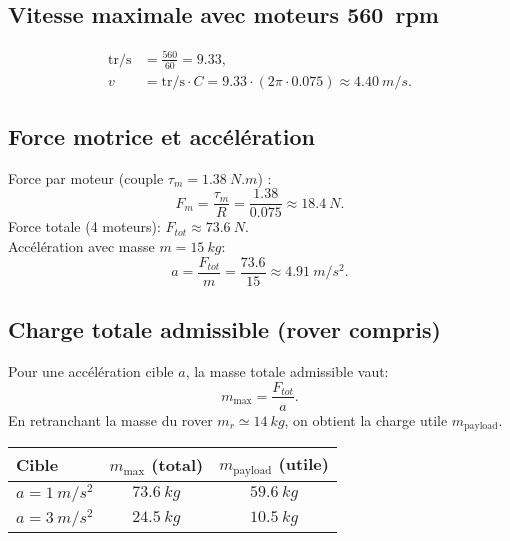 \documentclass[11pt,a4paper]{article}
\begin{document}
\subsection{Vitesse maximale avec moteurs \SI{560}{rpm}}
\begin{align}
\mathrm{tr/s} &= \frac{560}{60}=9.33,\\
v &= \mathrm{tr/s}\cdot C = 9.33\cdot (2\pi\cdot 0.075)\approx \boxed{\SI{4.40}{m/s}}.
\end{align}

\subsection{Force motrice et accélération}
Force par moteur (couple \(\tau_m=\SI{1.38}{N.m}\)) :
\begin{equation}
F_m=\frac{\tau_m}{R}=\frac{1.38}{0.075}\approx \SI{18.4}{N}.
\end{equation}
Force totale (4 moteurs): \(\boxed{F_{tot}\approx \SI{73.6}{N}}\).\\
Accélération avec masse \(m=\SI{15}{kg}\):
\begin{equation}
a=\frac{F_{tot}}{m}=\frac{73.6}{15}\approx \boxed{\SI{4.91}{m/s^2}}.
\end{equation}

\subsection{Charge totale admissible (rover compris)}
Pour une accélération cible \(a\), la masse totale admissible vaut:
\begin{equation}
m_{\max}=\frac{F_{tot}}{a}.
\end{equation}
En retranchant la masse du rover \(m_r\simeq\SI{14}{kg}\), on obtient la charge utile \(m_{\text{payload}}\).
\begin{center}
\begin{tabular}{lcc}
\toprule
Cible & \(m_{\max}\) (total) & \(m_{\text{payload}}\) (utile)\\
\midrule
\(a=\SI{1}{m/s^2}\) & \(\SI{73.6}{kg}\) & \(\boxed{\SI{59.6}{kg}}\)\\
\(a=\SI{3}{m/s^2}\) & \(\SI{24.5}{kg}\) & \(\boxed{\SI{10.5}{kg}}\)\\
\bottomrule
\end{tabular}
\end{center}
\end{document}
